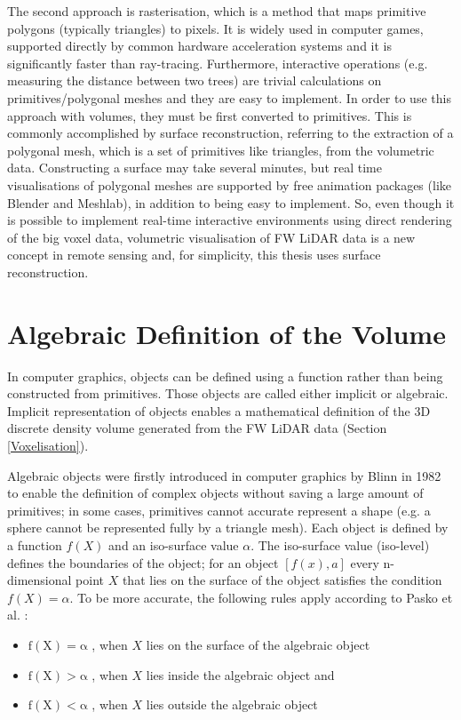 \documentclass{subfiles}
\begin{document}
\par The second approach is rasterisation, which is a method that maps primitive polygons (typically triangles) to pixels.  It is widely used in computer games, supported directly by common hardware acceleration systems and it is significantly faster than ray-tracing. Furthermore, interactive operations (e.g. measuring the distance between two trees) are trivial calculations on primitives/polygonal meshes and they are easy to implement.  In order to use this approach with volumes, they must be first converted to primitives.  This is commonly accomplished by surface reconstruction, referring to the extraction of a polygonal mesh, which is a set of primitives like triangles, from the volumetric data. Constructing a surface may take several minutes, but real time visualisations of polygonal meshes are supported by free animation packages (like Blender and Meshlab), in addition to being easy to implement.  So, even though it is possible to implement real-time interactive environments using direct rendering of the big voxel data, volumetric visualisation of FW LiDAR data is a new concept in remote sensing and, for simplicity, this thesis uses surface reconstruction.



\section{Algebraic Definition of the Volume}\label{sec:AlgebracObjects}

In computer graphics, objects can be defined using a function rather than being constructed from primitives. Those objects are called either implicit or algebraic. Implicit representation of objects enables a mathematical definition of the 3D discrete density volume generated from the FW LiDAR data (Section \ref{Voxelisation}). 

\par Algebraic objects were firstly introduced in computer graphics by Blinn in 1982 \cite{Blinn1982} to enable the definition of complex objects without saving a large amount of primitives; in some cases, primitives cannot accurate represent a shape (e.g. a sphere cannot be represented fully by a triangle mesh). Each object is defined by a function $ \mathit{f(X)} $ and an iso-surface value $\alpha$. The iso-surface value (iso-level) defines the boundaries of the object; for an object $ [f(x),a]$ every n-dimensional point $ \mathit{X} $  that lies on the surface of the object satisfies the condition $ \mathit{f(X)=\alpha }  $. To be more accurate, the following rules apply according to Pasko et al. \cite{Pasko1994}: 
\begin{itemize}
	\item $	\mathrm{f(X) = \alpha }$ , when $X$ lies on the surface of the algebraic object
	\item $	\mathrm{f(X) > \alpha }$ , when $X$ lies inside the algebraic object and
	\item $	\mathrm{f(X) < \alpha }$ , when $X$ lies outside the algebraic object	 
\end{itemize}
\end{document}
